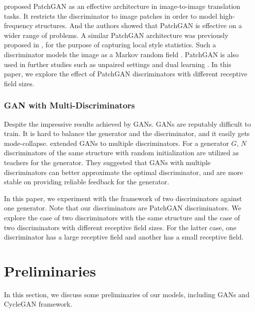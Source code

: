 \documentclass[letterpaper]{article} %
\newcommand{\zhiming}[1]{{\bf \color{blue} [Zhiming says: #1]}}
\begin{document}
	
	\cite{isola2016image} proposed PatchGAN as an effective architecture in image-to-image translation tasks. It restricts the discriminator to image patches in order to model high-frequency structures. And the authors showed that PatchGAN is effective on a wider range of problems. A similar PatchGAN architecture was previously proposed in \cite{li2016precomputed}, for the purpose of capturing local style statistics. Such a discriminator models the image as a Markov random field \cite{li2016precomputed}. PatchGAN is also used in further studies such as unpaired settings \cite{zhu2017unpaired} and dual learning \cite{yi2017dualgan}. In this paper, we explore the effect of PatchGAN discriminators with different receptive field sizes.
	
	
	
	
	
	\subsubsection{GAN with Multi-Discriminators}
	Despite the impressive results achieved by GANs. GANs are reputably difficult to train. It is hard to balance the generator and the discriminator, and it easily gets mode-collapse. \cite{durugkar2016generative} extended GANs to multiple discriminators. For a generator $G$, $N$ discriminators of the same structure with random initialization are utilized as teachers for the generator. They suggested that GANs with multiple discriminators can better approximate the optimal discriminator, and are more stable on providing reliable feedback for the generator.
	
	In this paper, we experiment with the framework of two discriminators against one generator. Note that our discriminators are PatchGAN discriminators. We explore the case of two discriminators with the same structure and the case of two discriminators with different receptive field sizes. For the latter case, one discriminator has a large receptive field and another has a small receptive field. 
	
	\section{Preliminaries}
	In this section, we discuss some preliminaries of our models, including GANs and CycleGAN framework.
	
\end{document}
